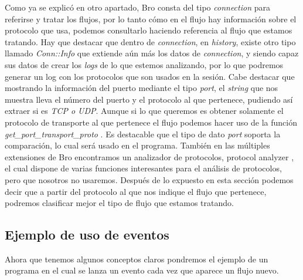 Como ya se explicó en otro apartado, Bro consta del tipo \textit{connection} \cite{connectiontype} 
para referirse y tratar los flujos, por lo tanto cómo en el flujo hay 
información sobre el protocolo que usa, podemos consultarlo haciendo 
referencia al flujo que estamos tratando. Hay que destacar que dentro 
de \textit{connection}, en \textit{history}, existe otro tipo llamado \textit{Conn::Info} \cite{conntype} que 
extiende aún más los datos de \textit{connection}, y siendo capaz sus datos de 
crear los \textit{logs} de lo que estemos analizando, por lo que podremos generar 
un log con los protocolos que son usados en la sesión. Cabe destacar que 
mostrando la información del puerto mediante el tipo \textit{port}, el \textit{string} que 
nos muestra lleva el número del puerto y el protocolo al que pertenece, 
pudiendo así extraer si es \textit{TCP o UDP}. Aunque si lo que queremos es 
obtener solamente el protocolo de transporte al que pertenece el flujo 
podemos hacer uso de la función \textit{get\_port\_transport\_proto} \cite{getproto}.
\intro
Es destacable que el tipo de dato  \textit{port} soporta la comparación, lo cual 
será usado en el programa.  
\intro
También en las múltiples extensiones de Bro encontramos un analizador 
de protocolos, protocol analyzer \cite{protoanalyzer}, el cual dispone de varias funciones 
interesantes para el análisis de protocolos, pero que nosotros no usaremos.
\intro
Después de lo expuesto en esta sección podemos decir que a partir del protocolo al que 
nos indique el flujo que pertenece, podremos clasificar mejor el tipo de flujo que estamos 
tratando.

\subsection{Ejemplo de uso de eventos}

Ahora que tenemos algunos conceptos claros pondremos el ejemplo de un 
programa en el cual se lanza un evento cada vez que aparece un flujo nuevo.
\intro

